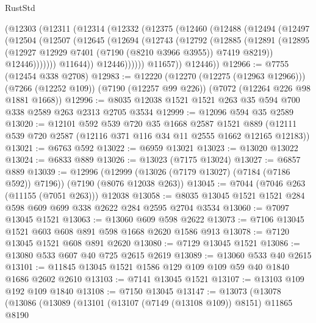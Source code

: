 \begin{lexlean}{RustStd}
\begin{coremodule}
        (@12303
          (@12311
            (@12314
              (@12332
                (@12375
                  (@12460
                    (@12488
                      (@12494
                        (@12497
                          (@12504
                            (@12507
                              (@12645
                                (@12694
                                  (@12743
                                    (@12792
                                      (@12885
                                        (@12891
                                          (@12895
                                            (@12927
                                              @12929
                                              @7401
                                              (@7190 (@8210 @3966 @3955))
                                              @7419
                                              @8219))
                                          @12446)))))))
                            @11644))
                        @12446))))))
            @11657))
        @12446))
@12966 := @7755 (@12454 @338 @2708)
@12983 := @12220
    (@12270 (@12275 (@12963 @12966)))
    (@7266 (@12252 @109))
    (@7190 (@12257 @99 @226))
    (@7072 (@12264 @226 @98 @1881 @1668))
@12996 := @8035 @12038 @1521 @1521 @263 @35 @594 @700 @338 @2589 @263 @2313 @2705 @3534
@12999 := @12096 @594 @35 @2589
@13020 := @12101
    @592
    @539
    @720
    @35
    @1668
    @2587
    @1521
    @889
    (@12111 @539 @720 @2587 (@12116 @371 @116 @34 @11 @2555 @1662 @12165 @12183))
@13021 := @6763 @592
@13022 := @6959 @13021
@13023 := @13020 @13022
@13024 := @6833 @889
@13026 := @13023 (@7175 @13024)
@13027 := @6857 @889
@13039 := @12996
    (@12999 (@13026 (@7179 @13027) (@7184 (@7186 @592)) @7196))
    (@7190 (@8076 @12038 @263))
@13045 := @7044 (@7046 @263 (@11155 (@7051 @263))) @12038
@13058 := @8035 @13045 @1521 @1521 @284 @598 @609 @699 @338 @2622 @284 @2595 @2704 @3534
@13060 := @7097 @13045 @1521
@13063 := @13060 @609 @598 @2622
@13073 := @7106 @13045 @1521 @603 @608 @891 @598 @1668 @2620 @1586 @913
@13078 := @7120 @13045 @1521 @608 @891 @2620
@13080 := @7129 @13045 @1521
@13086 := @13080 @533 @607 @40 @725 @2615 @2619
@13089 := @13060 @533 @40 @2615
@13101 := @11845 @13045 @1521 @1586 @129 @109 @109 @59 @40 @1840 @1686 @2602 @2610
@13103 := @7141 @13045 @1521
@13107 := @13103 @109 @192 @109 @1840
@13108 := @7150 @13045
@13147 := @13073
    (@13078
      (@13086
        (@13089
          (@13101
            (@13107 (@7149 (@13108 @109)) @8151)
            @11865
            @8190

\end{coremodule}
\end{lexlean}
